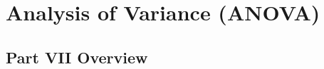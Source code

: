 \documentclass[
]{scrbook}
\begin{document}
\begin{verbatim}






\end{verbatim}

\hypertarget{part-analysis-of-variance-anova}{%
\part{Analysis of Variance (ANOVA)}\label{part-analysis-of-variance-anova}}

\hypertarget{Week8}{%
\chapter*{Part VII Overview}\label{Week8}}
\end{document}
